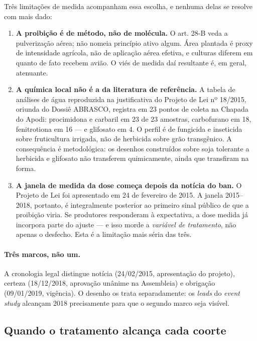 Três limitações de medida acompanham essa escolha, e nenhuma delas se resolve
com mais dado:

\begin{enumerate}
  \item \textbf{A proibição é de método, não de molécula.} O art. 28-B veda a
    pulverização aérea; não nomeia princípio ativo algum. Área plantada é proxy
    de intensidade agrícola, não de aplicação aérea efetiva, e culturas diferem
    em quanto de fato recebem avião. O viés de medida daí resultante é, em geral,
    atenuante.

  \item \textbf{A química local não é a da literatura de referência.} A tabela
    de análises de água reproduzida na justificativa do Projeto de Lei nº
    18/2015, oriunda do Dossiê ABRASCO, registra em 23 pontos de coleta na
    Chapada do Apodi: procimidona e carbaril em 23 de 23 amostras, carbofurano em
    18, fenitrotiona em 16 --- e glifosato em 4. O perfil é de fungicida e
    inseticida sobre fruticultura irrigada, não de herbicida sobre grão
    transgênico. A consequência é metodológica: os desenhos construídos sobre
    soja tolerante a herbicida e glifosato não transferem quimicamente, ainda que
    transfiram na forma.

  \item \textbf{A janela de medida da dose começa depois da notícia do ban.} O
    Projeto de Lei foi apresentado em 24 de fevereiro de 2015. A janela
    2015--2018, portanto, é integralmente posterior ao primeiro sinal público de
    que a proibição viria. Se produtores responderam à expectativa, a dose medida
    já incorpora parte do ajuste --- e isso morde a \emph{variável de tratamento},
    não apenas o desfecho. Esta é a limitação mais séria das três.
\end{enumerate}

\paragraph{Três marcos, não um.} A cronologia legal distingue notícia
(24/02/2015, apresentação do projeto), certeza (18/12/2018, aprovação unânime na
Assembleia) e obrigação (09/01/2019, vigência). O desenho os trata separadamente:
os \emph{leads} do \emph{event study} alcançam 2018 precisamente para que o
segundo marco seja visível.

\subsection{Quando o tratamento alcança cada coorte}
\label{sub:exposicao}

